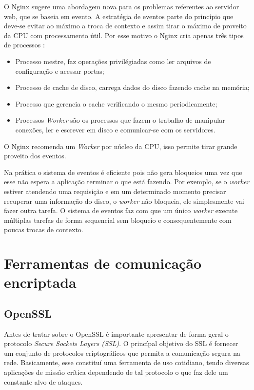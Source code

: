 O Nginx sugere uma abordagem nova para os problemas referentes ao servidor web,
que se baseia em evento. A estratégia de eventos parte do princípio que deve-se
evitar ao máximo a troca de contexto e assim tirar o máximo de proveito da CPU
com processamento útil. Por esse motivo o Nginx cria apenas três tipos de
processos \citep{nginx_architecture}:

\begin{itemize}
  \item Processo mestre, faz operações privilégiadas como ler arquivos de configuração e acessar portas;
  \item Processo de cache de disco, carrega dados do disco fazendo cache na memória;
  \item Processo que gerencia o cache verificando o mesmo periodicamente;
  \item Processos \textit{Worker} são os processos que fazem o trabalho de manipular conexões, ler e escrever em disco e comunicar-se com os servidores.
\end{itemize}

O Nginx recomenda um \textit{Worker} por núcleo da CPU, isso permite tirar
grande proveito dos eventos.

Na prática o sistema de eventos é eficiente pois não gera bloqueios uma vez que
esse não espera a aplicação terminar o que está fazendo. Por exemplo, se o
\textit{worker} estiver atendendo uma requisição e em um determinado momento
precisar recuperar uma informação do disco, o \textit{worker} não bloqueia, ele
simplesmente vai fazer outra tarefa. O sistema de eventos faz com que um único
\textit{worker} execute múltiplas tarefas de forma sequencial sem bloqueio e
consequentemente com poucas trocas de contexto.

\section{Ferramentas de comunicação encriptada}


\subsection{OpenSSL}

Antes de tratar sobre o OpenSSL é importante apresentar de forma geral o
protocolo \textit{Secure Sockets Layers (SSL)}. O princípal objetivo do SSL é
fornecer um conjunto de protocolos criptográficos que permita a comunicação
segura na rede. Basicamente, esse constituí uma ferramenta de uso cotidiano,
tendo diversas aplicações de missão crítica dependendo de tal protocolo o que
faz dele um constante alvo de ataques.

